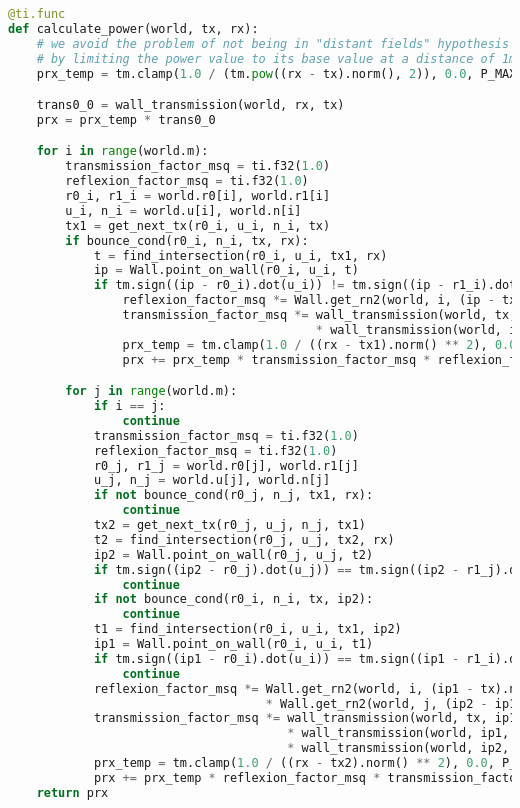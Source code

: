 \begin{lstlisting}[language=python]
@ti.func
def calculate_power(world, tx, rx):
    # we avoid the problem of not being in "distant fields" hypothesis
    # by limiting the power value to its base value at a distance of 1m
    prx_temp = tm.clamp(1.0 / (tm.pow((rx - tx).norm(), 2)), 0.0, P_MAX_CL)

    trans0_0 = wall_transmission(world, rx, tx)
    prx = prx_temp * trans0_0

    for i in range(world.m):
        transmission_factor_msq = ti.f32(1.0)
        reflexion_factor_msq = ti.f32(1.0)
        r0_i, r1_i = world.r0[i], world.r1[i]
        u_i, n_i = world.u[i], world.n[i]
        tx1 = get_next_tx(r0_i, u_i, n_i, tx)
        if bounce_cond(r0_i, n_i, tx, rx):
            t = find_intersection(r0_i, u_i, tx1, rx)
            ip = Wall.point_on_wall(r0_i, u_i, t)
            if tm.sign((ip - r0_i).dot(u_i)) != tm.sign((ip - r1_i).dot(u_i)):
                reflexion_factor_msq *= Wall.get_rn2(world, i, (ip - tx).normalized())
                transmission_factor_msq *= wall_transmission(world, tx, ip, i) \
                                           * wall_transmission(world, ip, rx, i)
                prx_temp = tm.clamp(1.0 / ((rx - tx1).norm() ** 2), 0.0, P_MAX_CL)
                prx += prx_temp * transmission_factor_msq * reflexion_factor_msq

        for j in range(world.m):
            if i == j:
                continue
            transmission_factor_msq = ti.f32(1.0)
            reflexion_factor_msq = ti.f32(1.0)
            r0_j, r1_j = world.r0[j], world.r1[j]
            u_j, n_j = world.u[j], world.n[j]
            if not bounce_cond(r0_j, n_j, tx1, rx):
                continue
            tx2 = get_next_tx(r0_j, u_j, n_j, tx1)
            t2 = find_intersection(r0_j, u_j, tx2, rx)
            ip2 = Wall.point_on_wall(r0_j, u_j, t2)
            if tm.sign((ip2 - r0_j).dot(u_j)) == tm.sign((ip2 - r1_j).dot(u_j)):
                continue
            if not bounce_cond(r0_i, n_i, tx, ip2):
                continue
            t1 = find_intersection(r0_i, u_i, tx1, ip2)
            ip1 = Wall.point_on_wall(r0_i, u_i, t1)
            if tm.sign((ip1 - r0_i).dot(u_i)) == tm.sign((ip1 - r1_i).dot(u_i)):
                continue
            reflexion_factor_msq *= Wall.get_rn2(world, i, (ip1 - tx).normalized()) \
                                    * Wall.get_rn2(world, j, (ip2 - ip1).normalized())
            transmission_factor_msq *= wall_transmission(world, tx, ip1, i) \
                                       * wall_transmission(world, ip1, ip2, j, i) \
                                       * wall_transmission(world, ip2, rx, j)
            prx_temp = tm.clamp(1.0 / ((rx - tx2).norm() ** 2), 0.0, P_MAX_CL)
            prx += prx_temp * reflexion_factor_msq * transmission_factor_msq
    return prx

\end{lstlisting}